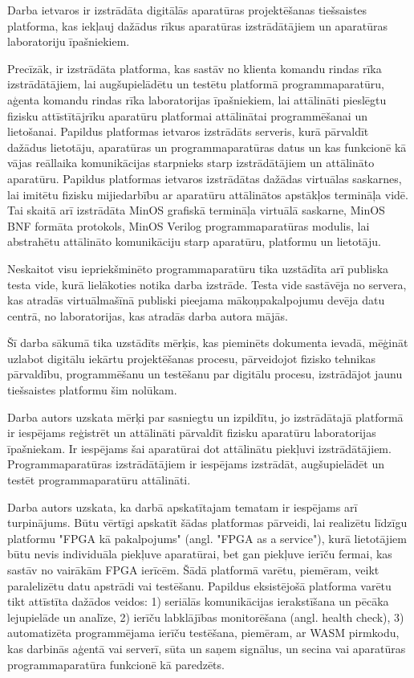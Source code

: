 Darba ietvaros ir izstrādāta digitālās aparatūras projektēšanas tiešsaistes
platforma, kas iekļauj dažādus rīkus aparatūras izstrādātājiem un aparatūras
laboratoriju īpašniekiem.

Precīzāk, ir izstrādāta platforma, kas sastāv no klienta komandu rindas rīka
izstrādātājiem, lai augšupielādētu un testētu platformā programmaparatūru,
aģenta komandu rindas rīka laboratorijas īpašniekiem, lai attālināti pieslēgtu
fizisku attīstītājrīku aparatūru platformai attālinātai programmēšanai un
lietošanai. Papildus platformas ietvaros izstrādāts serveris, kurā pārvaldīt
dažādus lietotāju, aparatūras un programmaparatūras datus un kas funkcionē kā
vājas reāllaika komunikācijas starpnieks starp izstrādātājiem un attālināto
aparatūru. Papildus platformas ietvaros izstrādātas dažādas virtuālas saskarnes,
lai imitētu fizisku mijiedarbību ar aparatūru attālinātos apstākļos termināļa
vidē. Tai skaitā arī izstrādāta MinOS grafiskā termināļa virtuālā saskarne,
MinOS BNF formāta protokols, MinOS Verilog programmaparatūras modulis, lai
abstrahētu attālināto komunikāciju starp aparatūru, platformu un lietotāju.
\cite{VeinbahsKrisjanisTestbed}

Neskaitot visu iepriekšminēto programmaparatūru tika uzstādīta arī publiska
testa vide, kurā lielākoties notika darba izstrāde. Testa vide sastāvēja no
servera, kas atradās virtuālmašīnā publiski pieejama mākoņpakalpojumu devēja
datu centrā, no laboratorijas, kas atradās darba autora mājās.
\cite{VeinbahsKrisjanisProduction}

Šī darba sākumā tika uzstādīts mērķis, kas pieminēts dokumenta ievadā, mēģināt
uzlabot digitālu iekārtu projektēšanas procesu, pārveidojot fizisko tehnikas
pārvaldību, programmēšanu un testēšanu par digitālu procesu, izstrādājot jaunu
tiešsaistes platformu šim nolūkam.

Darba autors uzskata mērķi par sasniegtu un izpildītu, jo izstrādātajā platformā
ir iespējams reģistrēt un attālināti pārvaldīt fizisku aparatūru laboratorijas
īpašniekam. Ir iespējams šai aparatūrai dot attālinātu piekļuvi izstrādātājiem.
Programmaparatūras izstrādātājiem ir iespējams izstrādāt, augšupielādēt un
testēt programmaparatūru attālināti. 

Darba autors uzskata, ka darbā apskatītajam tematam ir iespējams arī
turpinājums. Būtu vērtīgi apskatīt šādas platformas pārveidi, lai realizētu
līdzīgu platformu "FPGA kā pakalpojums" (angl. "FPGA as a service"), kurā
lietotājiem būtu nevis individuāla piekļuve aparatūrai, bet gan piekļuve ierīču
fermai, kas sastāv no vairākām FPGA ierīcēm. Šādā platformā varētu, piemēram,
veikt paralelizētu datu apstrādi vai testēšanu. Papildus eksistējošā platforma
varētu tikt attīstīta dažādos veidos: 1) seriālās komunikācijas ierakstīšana un
pēcāka lejupielāde un analīze, 2) ierīču labklājības monitorēšana (angl. health
check), 3) automatizēta programmējama ierīču testēšana, piemēram, ar WASM
pirmkodu, kas darbinās aģentā vai serverī, sūta un saņem signālus, un secina vai
aparatūras programmaparatūra funkcionē kā paredzēts.
